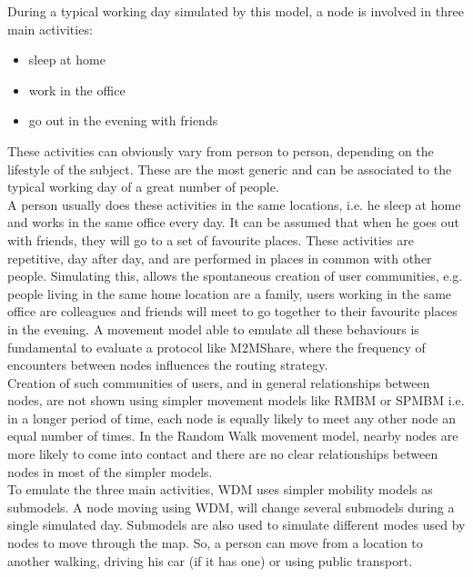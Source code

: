 During a typical working day simulated by this model, a node is involved in three main activities:
\begin{itemize}
\item sleep at home
\item work in the office
\item go out in the evening with friends
\end{itemize}
These activities can obviously vary from person to person, depending on the lifestyle of the subject. These are the most generic and can be associated to the typical working day of a great number of people.
\\

A person usually does these activities in the same locations, i.e. he sleep at home and works in the same office every day. It can be assumed that when he goes out with friends, they will go to a set of favourite places. These activities are repetitive, day after day, and are performed in places in common with other people. Simulating this, allows the spontaneous creation of user communities, e.g. people living in the same home location are a family, users working in the same office are colleagues and friends will meet to go together to their favourite places in the evening. A movement model able to emulate all these behaviours is fundamental to evaluate a protocol like M2MShare, where the frequency of encounters between nodes influences the routing strategy.\\

Creation of such communities of users, and in general relationships between nodes, are not shown using simpler movement models like RMBM or SPMBM i.e. in a longer period of time, each node is equally likely to meet any other node an equal number of times. In the Random Walk movement model, nearby nodes are more likely to come into contact and there are no clear relationships between nodes in most of the simpler models.
\\

To emulate the three main activities, WDM uses simpler mobility models as submodels. A node moving using WDM, will change several submodels during a single simulated day. Submodels are also used to simulate different modes used by nodes to move through the map. So, a person can move from a location to another walking, driving his car (if it has one) or using public transport.
\\


